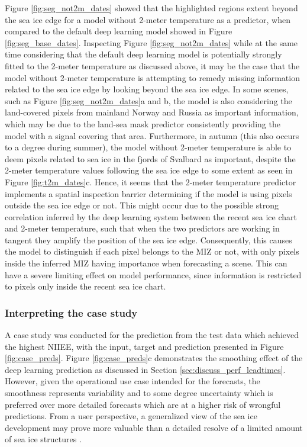 \documentclass[../main/thesis]{subfiles}
\begin{document}
Figure \ref{fig:seg_not2m_dates} showed that the highlighted regions extent beyond the sea ice edge for a model without 2-meter temperature as a predictor, when compared to the default deep learning model showed in Figure \ref{fig:seg_base_dates}. Inspecting Figure \ref{fig:seg_not2m_dates} while at the same time considering that the default deep learning model is potentially strongly fitted to the 2-meter temperature as discussed above, it may be the case that the model without 2-meter temperature is attempting to remedy missing information related to the sea ice edge by looking beyond the sea ice edge. In some scenes, such as Figure \ref{fig:seg_not2m_dates}a and b, the model is also considering the land-covered pixels from mainland Norway and Russia as important information, which may be due to the land-sea mask predictor consistently providing the model with a signal covering that area. Furthermore, in autumn (this also occurs to a degree during summer), the model without 2-meter temperature is able to deem pixels related to sea ice in the fjords of Svalbard as important, despite the 2-meter temperature values following the sea ice edge to some extent as seen in Figure \ref{fig:t2m_dates}c. Hence, it seems that the 2-meter temperature predictor implements a spatial inspection barrier determining if the model is using pixels outside the sea ice edge or not. This might occur due to the possible strong correlation inferred by the deep learning system between the recent sea ice chart and 2-meter temperature, such that when the two predictors are working in tangent they amplify the position of the sea ice edge. Consequently, this causes the model to distinguish if each pixel belongs to the MIZ or not, with only pixels inside the inferred MIZ having importance when forecasting a scene. This can have a severe limiting effect on model performance, since information is restricted to pixels only inside the recent sea ice chart.

\subsubsection{Interpreting the case study}
A case study was conducted for the prediction from the test data which achieved the highest NIIEE, with the input, target and prediction presented in Figure \ref{fig:case_preds}. Figure \ref{fig:case_preds}c demonstrates the smoothing effect of the deep learning prediction as discussed in Section \ref{sec:discuss_perf_leadtimes}. However, given the operational use case intended for the forecasts, the smoothness represents variability and to some degree uncertainty which is preferred over more detailed forecasts which are at a higher risk of wrongful predictions. From a user perspective, a generalized view of the sea ice development may prove more valuable than a detailed resolve of a limited amount of sea ice structures \citep{Murphy1993}.
\end{document}
